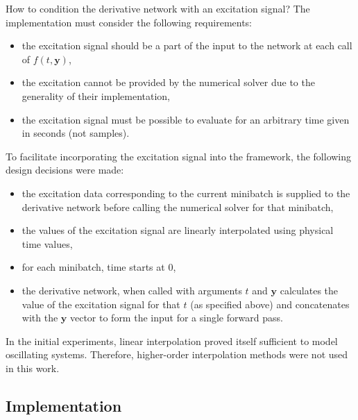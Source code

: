 How to condition the derivative network with an excitation signal? The implementation must consider the following requirements:
\begin{itemize}
  \item the excitation signal should be a part of the input to the network at each call of $f(t, \pmb{y})$,
  \item the excitation cannot be provided by the numerical solver due to the generality of their implementation,
  \item the excitation signal must be possible to evaluate for an arbitrary time given in seconds (not samples).
\end{itemize}

To facilitate incorporating the excitation signal into the framework, the following design decisions were made:
\begin{itemize}
  \item the excitation data corresponding to the current minibatch is supplied to the derivative network before calling the numerical solver for that minibatch,
  \item the values of the excitation signal are linearly interpolated using physical time values,
  \item for each minibatch, time starts at 0,
  \item the derivative network, when called with arguments $t$ and $\pmb{y}$ calculates the value of the excitation signal for that $t$ (as specified above) and concatenates with the $\pmb{y}$ vector to form the input for a single forward pass.
\end{itemize}

In the initial experiments, linear interpolation proved itself sufficient to model oscillating systems. Therefore, higher-order interpolation methods were not used in this work.


\subsection{Implementation}

